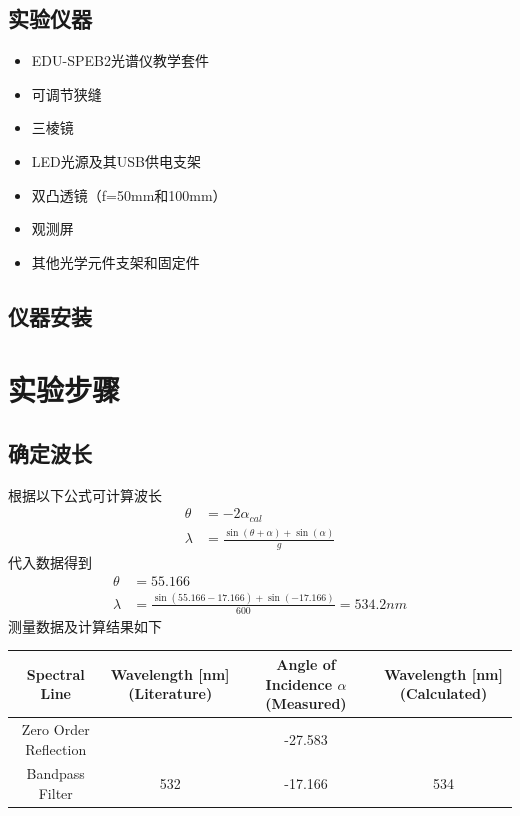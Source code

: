 \documentclass{ctexart}
\begin{document}
\subsection{实验仪器}
\begin{itemize}
    \item EDU-SPEB2光谱仪教学套件
    \item 可调节狭缝
    \item 三棱镜
    \item LED光源及其USB供电支架
    \item 双凸透镜（f=50mm和100mm）
    \item 观测屏
    \item 其他光学元件支架和固定件
\end{itemize}
\subsection{仪器安装}


\section{实验步骤}
\subsection{确定波长}
根据以下公式可计算波长
\begin{align}
    \theta &= -2 \alpha_{cal} \\
    \lambda &= \frac{\sin(\theta+\alpha)+\sin(\alpha)}{g}
\end{align}
代入数据得到
\begin{align}
    \theta &= 55.166 \\
    \lambda &= \frac{\sin(55.166-17.166)+\sin(-17.166)}{600} = 534.2nm
\end{align}
测量数据及计算结果如下
\begin{table}[h]
    \centering
    \begin{tabular}{|c|c|c|c|}
        \hline
        \rowcolor{yellow!25} Spectral Line & Wavelength [nm] (Literature)  & Angle of Incidence $\alpha$ (Measured) & Wavelength [nm] (Calculated)   \\
        \hline
        Zero Order Reflection & \- & -27.583 & \-  \\
        \hline
        Bandpass Filter & 532 & -17.166 & 534  \\
        \hline
    \end{tabular}
\end{table}
\end{document}
